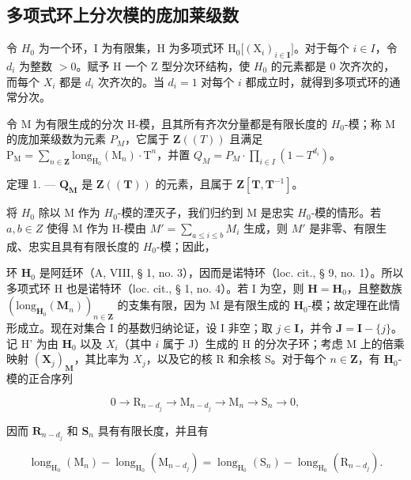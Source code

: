 \subsection{多项式环上分次模的庞加莱级数}

令 \(H_{0}\) 为一个环，I 为有限集，H 为多项式环 \(\mathrm{H}_{0}\big[(\mathrm{X}_{i})_{i\in\mathbf{I}}\big]\)。对于每个 \(i\in I\)，令 \(d_{i}\) 为整数 \(>0\)。赋予 H 一个 Z 型分次环结构，使 \(H_{0}\) 的元素都是 0 次齐次的，而每个 \(X_{i}\) 都是 \(d_{i}\) 次齐次的。当 \(d_{i}=1\) 对每个 \(i\) 都成立时，就得到多项式环的通常分次。

令 M 为有限生成的分次 H-模，且其所有齐次分量都是有限长度的 \(H_{0}\)-模；称 M 的庞加莱级数为元素 \(P_{M}\)，它属于 \(\mathbf{Z}((T))\) 且满足 \(\mathrm{P}_{\mathrm{M}} = \sum_{n \in \mathbf{Z}} \mathrm{long}_{\mathrm{H}_{0}}(\mathrm{M}_{n}) \cdot \mathrm{T}^{n}\)，并置 \(Q_{M} = P_{M} \cdot \prod_{i \in I} (1 - T^{d_{i}})\)。

定理 1. --- \(\mathbf{Q}_{\mathbf{M}}\) 是 \(\mathbf{Z}((\mathbf{T}))\) 的元素，且属于 \(\mathbf{Z}[\mathbf{T}, \mathbf{T}^{-1}]\)。

将 \(H_{0}\) 除以 M 作为 \(H_{0}\)-模的湮灭子，我们归约到 M 是忠实 \(H_{0}\)-模的情形。若 \(a, b \in Z\) 使得 M 作为 H-模由 \(M' = \sum_{a \leqslant i \leqslant b} M_{i}\) 生成，则 \(M'\) 是非零、有限生成、忠实且具有有限长度的 \(H_{0}\)-模；因此，

环 \(\mathbf{H}_0\) 是阿廷环（A, VIII, § 1, no. 3），因而是诺特环（loc. cit., § 9, no. 1）。所以多项式环 H 也是诺特环（loc. cit., § 1, no. 4）。若 I 为空，则 \(\mathbf{H} = \mathbf{H}_0\)，且整数族 \((\mathrm{long}_{\mathbf{H}_0}(\mathbf{M}_n))_{n \in \mathbf{Z}}\) 的支集有限，因为 M 是有限生成的 \(\mathbf{H}_0\)-模；故定理在此情形成立。现在对集合 I 的基数归纳论证，设 I 非空；取 \(j \in \mathbf{I}\)，并令 \(\mathbf{J} = \mathbf{I} - \{j\}\)。记 H' 为由 \(\mathbf{H}_0\) 以及 \(X_i\)（其中 \(i\) 属于 J）生成的 H 的分次子环；考虑 M 上的倍乘映射 \((\mathbf{X}_j)_\mathbf{M}\)，其比率为 \(X_j\)，以及它的核 R 和余核 S。对于每个 \(n \in \mathbf{Z}\)，有 \(\mathbf{H}_0\)-模的正合序列

\[
0 \rightarrow \mathrm{R} _ {n - d _ {j}} \rightarrow \mathrm{M} _ {n - d _ {j}} \rightarrow \mathrm{M} _ {n} \rightarrow \mathrm{S} _ {n} \rightarrow 0,
\]

因而 \(\mathbf{R}_{n - d_j}\) 和 \(\mathbf{S}_n\) 具有有限长度，并且有

\[
\operatorname{long} _ {\mathrm{H} _ {0}} \left(\mathrm{M} _ {n}\right) - \operatorname{long} _ {\mathrm{H} _ {0}} \left(\mathrm{M} _ {n - d _ {j}}\right) = \operatorname{long} _ {\mathrm{H} _ {0}} \left(\mathrm{S} _ {n}\right) - \operatorname{long} _ {\mathrm{H} _ {0}} \left(\mathrm{R} _ {n - d _ {j}}\right).\tag{4}
\]

